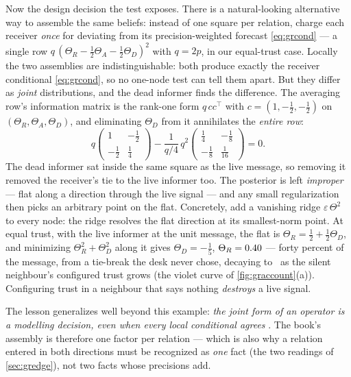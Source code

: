 Now the design decision the test exposes.  There is a natural-looking
alternative way to assemble the same beliefs: instead of one square
per relation, charge each receiver \emph{once} for deviating from its
precision-weighted forecast \cref{eq:grcond} --- a single row
$q\,(\Theta_R-\tfrac12\Theta_A-\tfrac12\Theta_D)^{2}$ with
$q=2p$, in our equal-trust case.  Locally the two assemblies are
indistinguishable: both produce exactly the receiver conditional
\cref{eq:grcond}, so no one-node test can tell them apart.  But they
differ as \emph{joint} distributions, and the dead informer finds the
difference.  The averaging row's information matrix is the rank-one
form $q\,cc^{\!\top}$ with $c=(1,-\tfrac12,-\tfrac12)$ on
$(\Theta_R,\Theta_A,\Theta_D)$, and eliminating $\Theta_D$ from it
annihilates the \emph{entire row}:
\[
q\begin{pmatrix}1&-\tfrac12\\[1pt]-\tfrac12&\tfrac14\end{pmatrix}
-\frac{1}{q/4}\,
q^{2}\begin{pmatrix}\tfrac14&-\tfrac18\\[1pt]-\tfrac18&\tfrac1{16}
\end{pmatrix}
=0 .
\]
The dead informer sat inside the same square as the live message, so
removing it removed the receiver's tie to the live informer too.  The
posterior is left \emph{improper} --- flat along a direction through
the live signal --- and any small regularization then picks an
arbitrary point on the flat.  Concretely, add a vanishing ridge
$\varepsilon\,\Theta^{2}$ to every node: the ridge resolves the flat
direction at its smallest-norm point.  At equal trust, with the live
informer at the unit message, the flat is
$\Theta_R=\tfrac12+\tfrac12\Theta_D$, and minimizing
$\Theta_R^{2}+\Theta_D^{2}$ along it gives $\Theta_D=-\tfrac15$,
$\Theta_R=0.40$ --- forty percent of the message, from a
tie-break the desk never chose, decaying to
\MacGrDeadAvgHigh\ as the silent neighbour's configured trust grows
(the violet curve of \cref{fig:graccount}(a)).  Configuring trust in
a neighbour that says nothing \emph{destroys} a live signal.

The lesson generalizes well beyond this example:
\emph{the joint form of an operator is a modelling decision, even when
every local conditional agrees}
\citep{Koller2009,Pearl1988}.  The book's assembly is therefore one
factor per relation --- which is also why a relation entered in both
directions must be recognized as \emph{one} fact (the two readings of
\cref{sec:gredge}), not two facts whose precisions add.


